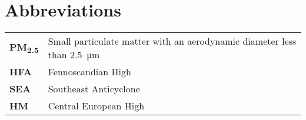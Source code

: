 \section*{Abbreviations}

\begin{tabular}{@{}ll@{}}
    \textbf{PM\textsubscript{2.5}} & Small particulate matter with an aerodynamic diameter less than \SI{2.5}{\micro\metre} \\[7mm]
    \textbf{HFA} & Fennoscandian High \\[7mm]
    \textbf{SEA} & Southeast Anticyclone \\[7mm]
    \textbf{HM}  & Central European High \\
    \end{tabular}


